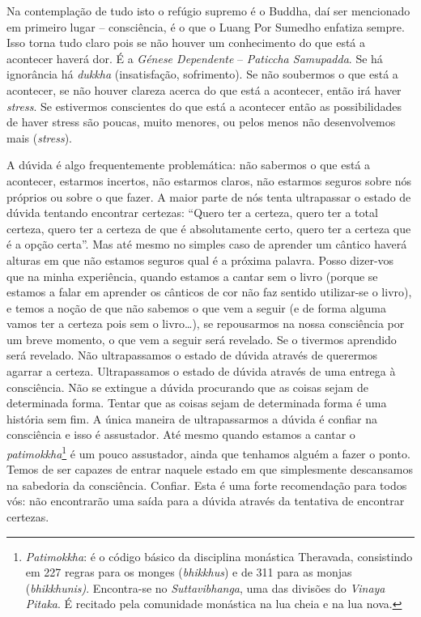 Na contemplação de tudo isto o refúgio supremo é o Buddha, daí ser
mencionado em primeiro lugar -- consciência, é o que o Luang Por Sumedho
enfatiza sempre. Isso torna tudo claro pois se não houver um
conhecimento do que está a acontecer haverá dor. É a \emph{Génese
Dependente} -- \emph{Paticcha Samupadda}. Se há ignorância há
\emph{dukkha} (insatisfação, sofrimento). Se não soubermos o que está a
acontecer, se não houver clareza acerca do que está a acontecer, então
irá haver \emph{stress}. Se estivermos conscientes do que está a
acontecer então as possibilidades de haver stress são poucas, muito
menores, ou pelos menos não desenvolvemos mais (\emph{stress}).

A dúvida é algo frequentemente problemática: não sabermos o que está a
acontecer, estarmos incertos, não estarmos claros, não estarmos seguros
sobre nós próprios ou sobre o que fazer. A maior parte de nós tenta
ultrapassar o estado de dúvida tentando encontrar certezas: ``Quero ter
a certeza, quero ter a total certeza, quero ter a certeza de que é
absolutamente certo, quero ter a certeza que é a opção certa''. Mas até
mesmo no simples caso de aprender um cântico haverá alturas em que não
estamos seguros qual é a próxima palavra. Posso dizer-vos que na minha
experiência, quando estamos a cantar sem o livro (porque se estamos a
falar em aprender os cânticos de cor não faz sentido utilizar-se o
livro), e temos a noção de que não sabemos o que vem a seguir (e de
forma alguma vamos ter a certeza pois sem o livro\ldots{}), se
repousarmos na nossa consciência por um breve momento, o que vem a
seguir será revelado. Se o tivermos aprendido será revelado. Não
ultrapassamos o estado de dúvida através de querermos agarrar a certeza.
Ultrapassamos o estado de dúvida através de uma entrega à consciência.
Não se extingue a dúvida procurando que as coisas sejam de determinada
forma. Tentar que as coisas sejam de determinada forma é uma história
sem fim. A única maneira de ultrapassarmos a dúvida é confiar na
consciência e isso é assustador. Até mesmo quando estamos a cantar o
\emph{patimokkha}\footnote{%
  \emph{Patimokkha}: é o código básico da disciplina monástica
  Theravada, consistindo em 227 regras para os monges (\emph{bhikkhus}) e
  de 311 para as monjas (\emph{bhikkhunis)}. Encontra-se no
  \emph{Suttavibhanga}, uma das divisões do \emph{Vinaya Pitaka}. É
  recitado pela comunidade monástica na lua cheia e na lua nova.
}
é um pouco assustador, ainda que tenhamos alguém a
fazer o ponto. Temos de ser capazes de entrar naquele estado em que
simplesmente descansamos na sabedoria da consciência. Confiar. Esta é
uma forte recomendação para todos vós: não encontrarão uma saída para a
dúvida através da tentativa de encontrar certezas.

